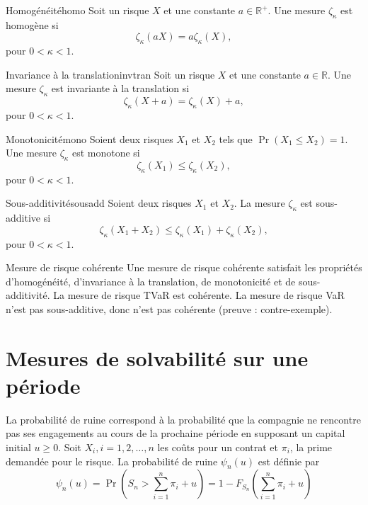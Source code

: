 \begin{propriete}{Homogénéité}{homo}
	Soit un risque $X$ et une constante $a \in \mathbb{R}^+$. Une mesure $\zeta_\kappa$ est homogène si $$\zeta_\kappa(aX) = a\zeta_\kappa(X),$$
	pour $0<\kappa<1$.
\end{propriete}

\begin{propriete}{Invariance à la translation}{invtran}
	Soit un risque $X$ et une constante $a \in \mathbb{R}$. Une mesure $\zeta_\kappa$ est invariante à la translation si $$\zeta_\kappa(X + a) = \zeta_\kappa(X) + a,$$
	pour $0<\kappa<1$.
\end{propriete}

\begin{propriete}{Monotonicité}{mono}
	Soient deux risques $X_1$ et $X_2$ tels que $\Pr(X_1 \leq X_2) = 1$. Une mesure $\zeta_\kappa$ est monotone si 
	$$\zeta_\kappa(X_1) \leq \zeta_\kappa(X_2),$$
	pour $0<\kappa<1$.
\end{propriete}

\begin{propriete}{Sous-additivité}{sousadd}
	Soient deux risques $X_1$ et $X_2$. La mesure $\zeta_\kappa$ est sous-additive si 
	$$\zeta_\kappa(X_1 + X_2)\leq \zeta_\kappa(X_1) + \zeta_\kappa(X_2),$$
	pour $0<\kappa<1$.
\end{propriete}

\begin{definition}{Mesure de risque cohérente}{}
	Une mesure de risque cohérente satisfait les propriétés d'homogénéité, d'invariance à la translation, de monotonicité et de sous-additivité. La mesure de risque TVaR est cohérente. La mesure de risque VaR n'est pas sous-additive, donc n'est pas cohérente (preuve : contre-exemple).
\end{definition}

\section{Mesures de solvabilité sur une période}

\begin{definition}{}{}
	La probabilité de ruine correspond à la probabilité que la compagnie ne rencontre pas ses engagements au cours de la prochaine période en supposant un capital initial $u\geq 0$. Soit $X_i, i = 1, 2, \dots, n$ les coûts pour un contrat et $\pi_i$, la prime demandée pour le risque. La probabilité de ruine $\psi_n(u)$ est définie par
	$$\psi_n(u) = \Pr\left(S_n > \sum_{i = 1}^{n} \pi_i + u\right) = 1 - F_{S_n}\left(\sum_{i = 1}^{n}\pi_i + u\right)$$
\end{definition}

